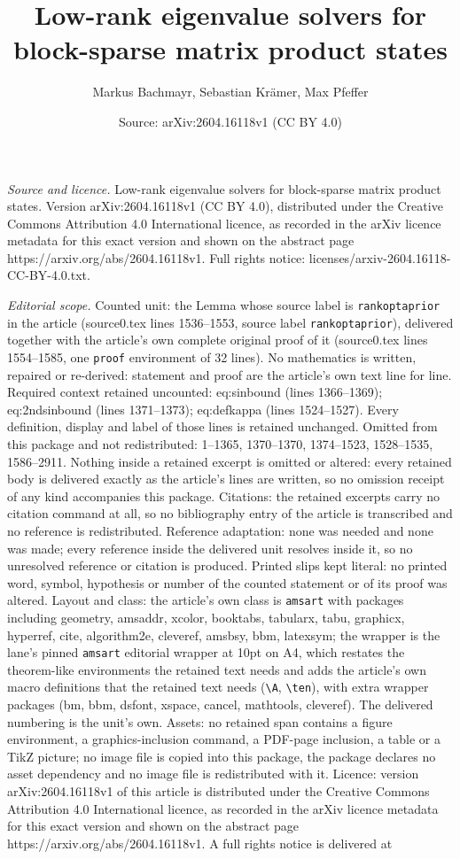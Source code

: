 \documentclass[10pt,a4paper]{amsart}
\title[Low-rank eigenvalue solvers for block-sparse matrix product ]{Low-rank eigenvalue solvers for block-sparse matrix product states}
\author{Markus Bachmayr, Sebastian Kr\"amer, Max Pfeffer}
\date{Source: arXiv:2604.16118v1 (CC BY 4.0)}
\begin{document}
\maketitle

\noindent\emph{Source and licence.} Low-rank eigenvalue solvers for block-sparse matrix product states. Version arXiv:2604.16118v1 (CC BY 4.0), distributed under the Creative Commons Attribution 4.0 International licence, as recorded in the arXiv licence metadata for this exact version and shown on the abstract page https://arxiv.org/abs/2604.16118v1. Full rights notice: licenses/arxiv-2604.16118-CC-BY-4.0.txt.\par\smallskip

\noindent\textit{Editorial scope.} Counted unit: the Lemma whose source label is \texttt{rankoptaprior} in the article (source0.tex lines 1536--1553, source label \texttt{rankoptaprior}), delivered together with the article's own complete original proof of it (source0.tex lines 1554--1585, one \texttt{proof} environment of 32 lines). No mathematics is written, repaired or re-derived: statement and proof are the article's own text line for line. Required context retained uncounted: eq:sinbound (lines 1366--1369); eq:2ndsinbound (lines 1371--1373); eq:defkappa (lines 1524--1527). Every definition, display and label of those lines is retained unchanged. Omitted from this package and not redistributed: 1--1365, 1370--1370, 1374--1523, 1528--1535, 1586--2911. Nothing inside a retained excerpt is omitted or altered: every retained body is delivered exactly as the article's lines are written, so no omission receipt of any kind accompanies this package. Citations: the retained excerpts carry no citation command at all, so no bibliography entry of the article is transcribed and no reference is redistributed. Reference adaptation: none was needed and none was made; every reference inside the delivered unit resolves inside it, so no unresolved reference or citation is produced. Printed slips kept literal: no printed word, symbol, hypothesis or number of the counted statement or of its proof was altered. Layout and class: the article's own class is \texttt{amsart} with packages including geometry, amsaddr, xcolor, booktabs, tabularx, tabu, graphicx, hyperref, cite, algorithm2e, cleveref, amsbsy, bbm, latexsym; the wrapper is the lane's pinned \texttt{amsart} editorial wrapper at 10pt on A4, which restates the theorem-like environments the retained text needs and adds the article's own macro definitions that the retained text needs (\texttt{\textbackslash A}, \texttt{\textbackslash ten}), with extra wrapper packages (bm, bbm, dsfont, xspace, cancel, mathtools, cleveref). The delivered numbering is the unit's own. Assets: no retained span contains a figure environment, a graphics-inclusion command, a PDF-page inclusion, a table or a TikZ picture; no image file is copied into this package, the package declares no asset dependency and no image file is redistributed with it. Licence: version arXiv:2604.16118v1 of this article is distributed under the Creative Commons Attribution 4.0 International licence, as recorded in the arXiv licence metadata for this exact version and shown on the abstract page https://arxiv.org/abs/2604.16118v1. A full rights notice is delivered at 
\end{document}
